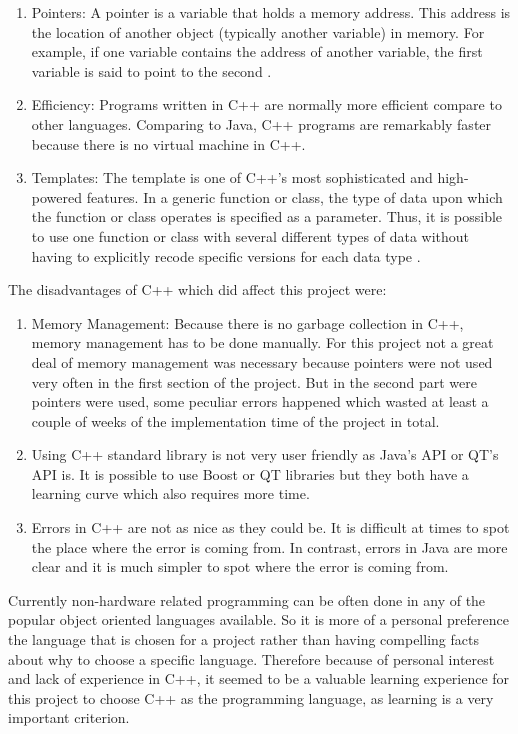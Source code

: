 \documentclass[10pt, a4paper, titlepage]{article}
\begin{document}
\begin{enumerate}
\item Pointers: A pointer is a variable that holds a memory address. This address is the location of another object (typically another variable) in memory. For example, if one variable
contains the address of another variable, the first variable is said to point to the second \cite{C++Ref_book}.
\item Efficiency: Programs written in C++ are normally more efficient compare to other languages. Comparing to Java, C++ programs are remarkably faster because there is no virtual machine in C++.
\item Templates: The template is one of C++'s most sophisticated and high-powered features. In a generic function or class, the type of data upon which the function or class operates is specified as a parameter. Thus, it is possible to use one function or class with several different types of data without having to explicitly recode specific versions for each data type \cite{C++Ref_book}.
\end{enumerate}

The disadvantages of C++ which did affect this project were:
\begin{enumerate}
\item Memory Management: Because there is no garbage collection in C++, memory management has to be done manually. For this project not a great deal of memory management was necessary because pointers were not used very often in the first section of the project. But in the second part were pointers were used, some peculiar errors happened which wasted at least a couple of weeks of the implementation time of the project in total.
\item Using C++ standard library is not very user friendly as Java's API or QT's API is. It is possible to use Boost or QT libraries but they both have a learning curve which also requires more time.
\item Errors in C++ are not as nice as they could be. It is difficult at times to spot the place where the error is coming from. In contrast, errors in Java are more clear and it is much simpler to spot where the error is coming from. 
\end{enumerate}

Currently non-hardware related programming can be often done in any of the popular object oriented languages available. So it is more of a personal preference the language that is chosen for a project rather than having compelling facts about why to choose a specific language. Therefore because of personal interest and lack of experience in C++, it seemed to be a valuable learning experience for this project to choose C++ as the programming language, as learning is a very important criterion.\\
\end{document}
